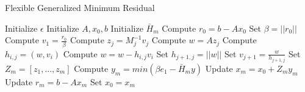 \begin{algorithm}
    \caption{Flexible Generalized Minimum Residual}
    \begin{algorithmic}[1]
        \State Initialize $\epsilon$ 
        \State Initialize  $A, x_0, b$
        \State Initialize $\bar{H}_m$
            \State Compute $r_0 = b - Ax_0$
            \State Set $\beta = ||r_0||$
            \State Compute $v_1 = \frac{r_0}{\beta}$
             
                \State Compute $z_j = M^{-1}_jv_j$ 
                \State Compute $w = Az_j$
                    \State Compute $h_{i,j} = (w, v_i)$
                    \State Compute $w = w - h_{i,j}v_i$
                \EndFor
                \State Set $h_{j+1,j} = ||w||$
                \State Set $v_{j+1} = \frac{w}{h_{j+1,j}}$
            \EndFor
            \State Set $Z_m = [z_1, ..., z_m]$
            \State Compute $y_m = min(\beta e_1 - \bar{H}_m y)$ 
            \State Update $x_m = x_0 + Z_my_m$
            \State Update $r_m = b - Ax_m$
            \State Set $x_0 = x_m$
        \EndWhile
    \end{algorithmic}
    \label{alg:fgmres}
    \end{algorithm}